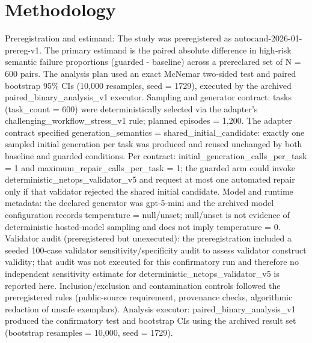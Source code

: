 \documentclass[conference]{IEEEtran}
\begin{document}
\section{Methodology}
Preregistration and estimand: The study was preregistered as autocand-2026-01-prereg-v1. The primary estimand is the paired absolute difference in high‑risk semantic failure proportions (guarded - baseline) across a prereclared set of N = 600 pairs. The analysis plan used an exact McNemar two‑sided test and paired bootstrap 95\% CIs (10,000 resamples, seed = 1729), executed by the archived paired\_binary\_analysis\_v1 executor. Sampling and generator contract: tasks (task\_count = 600) were deterministically selected via the adapter's challenging\_workflow\_stress\_v1 rule; planned episodes = 1,200. The adapter contract specified generation\_semantics = shared\_initial\_candidate: exactly one sampled initial generation per task was produced and reused unchanged by both baseline and guarded conditions. Per contract: initial\_generation\_calls\_per\_task = 1 and maximum\_repair\_calls\_per\_task = 1; the guarded arm could invoke deterministic\_netops\_validator\_v5 and request at most one automated repair only if that validator rejected the shared initial candidate. Model and runtime metadata: the declared generator was gpt‑5‑mini and the archived model configuration records temperature = null/unset; null/unset is not evidence of deterministic hosted‑model sampling and does not imply temperature = 0. Validator audit (preregistered but unexecuted): the preregistration included a seeded 100‑case validator sensitivity/specificity audit to assess validator construct validity; that audit was not executed for this confirmatory run and therefore no independent sensitivity estimate for deterministic\_netops\_validator\_v5 is reported here. Inclusion/exclusion and contamination controls followed the preregistered rules (public‑source requirement, provenance checks, algorithmic redaction of unsafe exemplars). Analysis executor: paired\_binary\_analysis\_v1 produced the confirmatory test and bootstrap CIs using the archived result set (bootstrap resamples = 10,000, seed = 1729).
\end{document}
